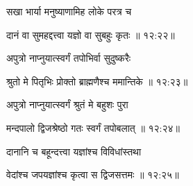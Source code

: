 {\devanagarifont सखा भार्या मनुष्याणामिह लोके परत्र च \thinspace{\dandab} \dontdisplaylinenum }%


{\devanagarifont दानं वा सुमहद्दत्त्वा यज्ञो वा सुबहुः कृतः {॥ १२:२२॥} \veg\dontdisplaylinenum }%

{\devanagarifont अपुत्रो नाप्नुयात्स्वर्गं तपोभिर्वा सुदुष्करैः \thinspace{\dandab} \dontdisplaylinenum }%


{\devanagarifont श्रुतो मे पितृभिः प्रोक्तो ब्राह्मणैश्च ममान्तिके {॥ १२:२३॥} \veg\dontdisplaylinenum }%

{\devanagarifont अपुत्रो नाप्नुयात्स्वर्गं श्रुतं मे बहुशः पुरा \thinspace{\dandab} \dontdisplaylinenum }%


{\devanagarifont मन्दपालो द्विजश्रेष्ठो गतः स्वर्गं तपोबलात् {॥ १२:२४॥} \veg\dontdisplaylinenum }%

{\devanagarifont दानानि च बहून्दत्त्वा यज्ञांश्च विविधांस्तथा \thinspace{\dandab} \dontdisplaylinenum }%


{\devanagarifont वेदांश्च जपयज्ञांश्च कृत्वा स द्विजसत्तमः {॥ १२:२५॥} \veg\dontdisplaylinenum }%


